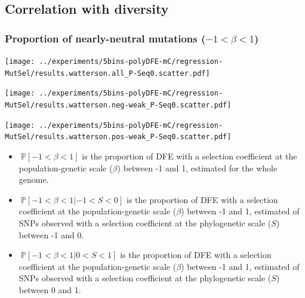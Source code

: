 \documentclass{article}
\newcommand{\proba}{\mathbb{P}}
\newcommand{\Sphy}{S}
\newcommand{\divWeakDel}{-1 < \Sphy < 0}
\newcommand{\divWeakAdv}{0 < \Sphy < 1}
\newcommand{\Spop}{\beta}
\newcommand{\polyNeutral}{-1 < \Spop < 1}
\begin{document}
    \newpage

    \subsection{Correlation with diversity}

    \subsubsection{Proportion of nearly-neutral mutations ($\polyNeutral$)}\label{subsec:proportion-nearly-neutral-mutations}
    \begin{minipage}{0.32\linewidth}
        \texttt{[image: ../experiments/5bins-polyDFE-mC/regression-MutSel/results.watterson.all\_P-Seq0.scatter.pdf]}
    \end{minipage}
    \begin{minipage}{0.32\linewidth}
        \texttt{[image: ../experiments/5bins-polyDFE-mC/regression-MutSel/results.watterson.neg-weak\_P-Seq0.scatter.pdf]}
    \end{minipage}
    \begin{minipage}{0.32\linewidth}
        \texttt{[image: ../experiments/5bins-polyDFE-mC/regression-MutSel/results.watterson.pos-weak\_P-Seq0.scatter.pdf]}
    \end{minipage}
    \begin{itemize}
        \item $\ \proba [ \polyNeutral ]$ is the proportion of DFE with a selection coefficient at the population-genetic scale ($\Spop$) between -1 and 1, estimated for the whole genome.
        \item $\ \proba [ \polyNeutral | \divWeakDel]$ is the proportion of DFE with a selection coefficient at the population-genetic scale ($\Spop$) between -1 and 1, estimated of SNPs observed with a selection coefficient at the phylogenetic scale ($\Sphy$) between -1 and 0.
        \item $\ \proba [ \polyNeutral | \divWeakAdv ]$ is the proportion of DFE with a selection coefficient at the population-genetic scale ($\Spop$) between -1 and 1, estimated of SNPs observed with a selection coefficient at the phylogenetic scale ($\Sphy$) between 0 and 1.
    \end{itemize}
\end{document}
